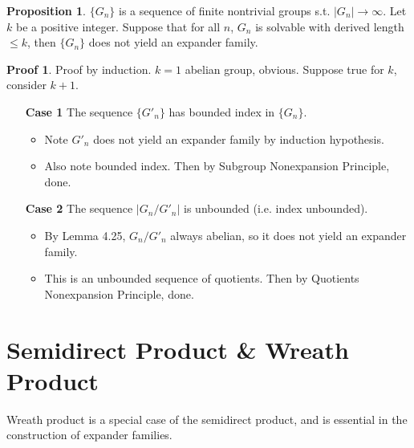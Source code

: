 \documentclass{book}
\newcommand{\abs}[1]{\lvert #1 \rvert }
\theoremstyle{definition}
\newtheorem{proposition}[lemma]{Proposition}
\theoremstyle{remarkstyle}
\newtheorem*{myproof}{Proof}%
\begin{document}
\begin{proposition}
    $\{G_{n}\} $ is a sequence of finite nontrivial groups s.t. $\abs{G_{n}}\rightarrow \infty $. Let $k$ be a positive integer. Suppose that for all $n$, $G_{n} $ is solvable with derived length $\le k$, then $\{G_{n}\} $ does not yield an expander family.
\end{proposition}
\begin{myproof}
    Proof by induction. $k=1$ abelian group, obvious. Suppose true for $k$, consider $k+1$.
    \begin{itemize}
        \item[\textbf{Case 1}] The sequence $\{G'_{n}\} $ has bounded index in $\{G_{n}\} $. 
        \begin{itemize}
            \item Note $G'_{n} $ does not yield an expander family by induction hypothesis. 
            \item Also note bounded index. Then by Subgroup Nonexpansion Principle, done. 
        \end{itemize}
        \item[\textbf{Case 2}] The sequence $\abs{G_{n}/G'_{n}}$ is unbounded (i.e. index unbounded).
        \begin{itemize}
            \item By Lemma 4.25, $G_{n}/G'_{n} $ always abelian, so it does not yield an expander family. 
            \item This is an unbounded sequence of quotients. Then by Quotients Nonexpansion Principle, done.
        \end{itemize}
        \item[] 
    \end{itemize}
\end{myproof}


\section{Semidirect Product \& Wreath Product}
Wreath product is a special case of the semidirect product, and is essential in the construction of expander families. \newline
\end{document}
